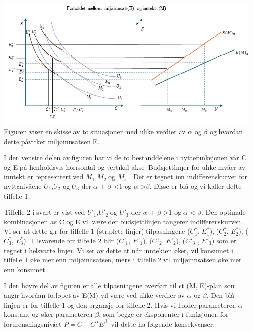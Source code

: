 \documentclass[
  12pt,
  letterpaper,
  DIV=11,
  numbers=noendperiod]{scrartcl}
\begin{document}
\includegraphics{Forholdet mellom E og inntekt_1.png} Figuren viser en
skisse av to situasjoner med ulike verdier av \(\alpha\) og \(\beta\) og
hvordan dette påvirker miljøinnsatsen E.

I den venstre delen av figuren har vi de to bestanddelene i
nyttefunksjonen vår C og E på henholdsvis horisontal og vertikal akse.
Budsjettlinjer for ulike nivåer av inntekt er representert ved
\(M_1\),\(M_2\) og \(M_3\) . Det er tegnet inn indifferenskurver for
nyttenivåene \(U_1\),\(U_2\) og \(U_3\) der \(\alpha\) + \(\beta\)
\textless1 og \(\alpha\) \textgreater{}\(\beta\). Disse er blå og vi
kaller dette tilfelle 1.

Tilfelle 2 i svart er vist ved \(U'_1\),\(U'_2\) og \(U'_3\) der
\(\alpha\) + \(\beta\) \textgreater1 og \(\alpha\) \textless{}
\(\beta\). Den optimale kombinasjonen av C og E vil være der
budsjettlinjen tangerer indifferenskurven. Vi ser at dette gir for
tilfelle 1 (striplete linjer) tilpasningene (\(C^*_1\), \(E^*_1\)),
(\(C^*_2\), \(E^*_2\)), (\(C^*_3\), \(E^*_3\)). Tilsvarende for tilfelle
2 blir (\(C'_1\), \(E'_1\)), (\(C'_2\), \(E'_2\)), (\(C'_3\) , \(E'_3\))
som er tegnet i helsvarte linjer. Vi ser av dette at når inntekten øker,
vil konsumet i tilfelle 1 øke mer enn miljøinnsatsen, mens i tilfelle 2
vil miljøinnsatsen øke mer enn konsumet.

I den høyre del av figuren er alle tilpasningene overført til et (M,
E)-plan som angir hvordan forløpet av E(M) vil være ved ulike verdier av
\(\alpha\) og \(\beta\). Den blå linjen er for tilfelle 1 og den
organsje for tilfelle 2. Hvis vi holder parameteren \(\alpha\) konstant
og øker parameteren \(\beta\), som begge er eksponenter i funksjonen for
forurensningsnivået \(P=C-C^\alpha E^\beta\), vil dette ha følgende
konsekvenser:
\end{document}
